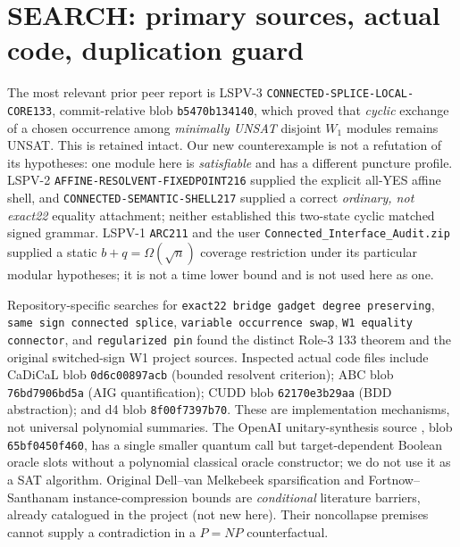 \documentclass[11pt]{article}
\begin{document}
\section{SEARCH: primary sources, actual code, duplication guard}
The most relevant prior peer report is LSPV-3 \texttt{CONNECTED-SPLICE-LOCAL-CORE133}, commit-relative blob \texttt{b5470b134140}, which proved that \emph{cyclic} exchange of a chosen occurrence among \emph{minimally UNSAT} disjoint $W_1$ modules remains UNSAT. This is retained intact. Our new counterexample is not a refutation of its hypotheses: one module here is \emph{satisfiable} and has a different puncture profile. LSPV-2 \texttt{AFFINE-RESOLVENT-FIXEDPOINT216} supplied the explicit all-YES affine shell, and \texttt{CONNECTED-SEMANTIC-SHELL217} supplied a correct \emph{ordinary, not exact22} equality attachment; neither established this two-state cyclic matched signed grammar. LSPV-1 \texttt{ARC211} and the user \texttt{Connected\_Interface\_Audit.zip} supplied a static $b+q=\Omega(\sqrt n)$ coverage restriction under its particular modular hypotheses; it is not a time lower bound and is not used here as one.

Repository-specific searches for \texttt{exact22 bridge gadget degree preserving}, \texttt{same sign connected splice}, \texttt{variable occurrence swap}, \texttt{W1 equality connector}, and \texttt{regularized pin} found the distinct Role-3 133 theorem and the original switched-sign W1 project sources. Inspected actual code files include CaDiCaL  blob \texttt{0d6c00897acb} (bounded resolvent criterion); ABC  blob \texttt{76bd7906bd5a} (AIG quantification); CUDD  blob \texttt{62170e3b29aa} (BDD abstraction); and d4  blob \texttt{8f00f7397b70}. These are implementation mechanisms, not universal polynomial summaries. The OpenAI unitary-synthesis source , blob \texttt{65bf0450f460}, has a single smaller quantum call but target-dependent Boolean oracle slots without a polynomial classical oracle constructor; we do not use it as a SAT algorithm. Original Dell--van Melkebeek sparsification and Fortnow--Santhanam instance-compression bounds are \emph{conditional} literature barriers, already catalogued in the project (not new here). Their noncollapse premises cannot supply a contradiction in a $P=NP$ counterfactual.
\end{document}
